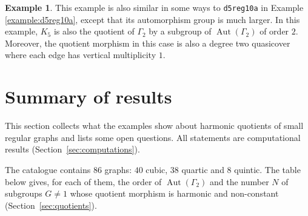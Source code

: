 \documentclass[12pt,letterpaper]{article}
\theoremstyle{definition}
\newtheorem{example}[theorem]{Example}
\DeclareMathOperator{\Aut}{Aut}
\begin{document}
\begin{example}
{This example is also similar in some ways to {\tt d5reg10a}
in Example \ref{example:d5reg10a}, except that
its automorphism group is much larger. In this
example, $K_5$ is also the quotient of $\Gamma_2$ by
a subgroup of $\Aut(\Gamma_2)$ of order $2$. Moreover, the quotient morphism
in this case is also a degree two quasicover
where each edge has vertical multiplicity $1$.
}
\end{example}



\section{Summary of results}
\label{sec:summary}

This section collects what the examples show about harmonic quotients of
small regular graphs and lists some open questions. All statements are
computational results (Section~\ref{sec:computations}).

The catalogue contains $86$ graphs: $40$ cubic, $38$ quartic and $8$
quintic. The table below gives, for each of them, the order of
$\Aut(\Gamma_2)$ and the number $N$ of subgroups $G\neq 1$ whose quotient
morphism is harmonic and non-constant (Section~\ref{sec:quotients}).
\end{document}
